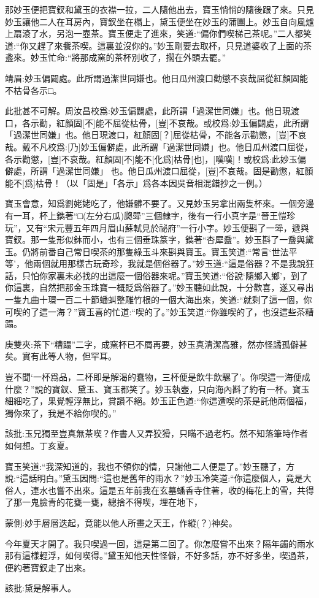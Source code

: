 \begin{parag}
    那妙玉便把寶釵和黛玉的衣襟一拉，二人隨他出去，寶玉悄悄的隨後跟了來。只見妙玉讓他二人在耳房內，寶釵坐在榻上，黛玉便坐在妙玉的蒲團上。妙玉自向風爐上扇滾了水，另泡一壺茶。寶玉便走了進來，笑道:“偏你們喫梯己茶呢。”二人都笑道:“你又趕了來飺茶喫。這裏並沒你的。”妙玉剛要去取杯，只見道婆收了上面的茶盞來。妙玉忙命:“將那成窯的茶杯別收了，擱在外頭去罷。”\begin{note}靖眉:妙玉偏闢處。此所謂過潔世同嫌也。他日瓜州渡口勸懲不哀哉屈從紅顏固能不枯骨各示□。\end{note}\begin{subnote}此批甚不可解。周汝昌校爲:妙玉偏闢處，此所謂「過潔世同嫌」也。他日現渡口，各示勸，紅顏固[不]能不屈從枯骨，[豈]不哀哉。或校爲:妙玉偏闢處，此所謂「過潔世同嫌」也。他日現渡口，紅顏固[？]屈從枯骨，不能各示勸懲，[豈]不哀哉。戴不凡校爲:[乃]妙玉偏僻處，此所謂「過潔世同嫌」也。他日瓜州渡口屈從，各示勸懲，[豈]不哀哉。紅顏固[不]能不[化爲]枯骨[也]，[嘆嘆]！或校爲:此妙玉偏僻處，所謂「過潔世同嫌」 也。他日瓜州渡口屈從，[豈]不哀哉。固是勸懲，紅顏能不[爲]枯骨！（以「固是」「各示」爲各本因吳音相混錯抄之一例。）\end{subnote}寶玉會意，知爲劉姥姥吃了，他嫌髒不要了。又見妙玉另拿出兩隻杯來。一個旁邊有一耳，杯上鐫著“□(左分右瓜)瓟斝”三個隸字，後有一行小真字是“晉王愷珍玩”，又有“宋元豐五年四月眉山蘇軾見於祕府”一行小字。妙玉便斟了一斝，遞與寶釵。那一隻形似鉢而小，也有三個垂珠篆字，鐫著“杏犀䀉”。妙玉斟了一䀉與黛玉。仍將前番自己常日喫茶的那隻綠玉斗來斟與寶玉。寶玉笑道:“常言‘世法平等’，他兩個就用那樣古玩奇珍，我就是個俗器了。”妙玉道:“這是俗器？不是我說狂話，只怕你家裏未必找的出這麼一個俗器來呢。”寶玉笑道:“俗說‘隨鄉入鄉’，到了你這裏，自然把那金玉珠寶一概貶爲俗器了。”妙玉聽如此說，十分歡喜，遂又尋出一隻九曲十環一百二十節蟠虯整雕竹根的一個大海出來，笑道:“就剩了這一個，你可喫的了這一海？”寶玉喜的忙道:“喫的了。”妙玉笑道:“你雖喫的了，也沒這些茶糟蹋。\begin{note}庚雙夾:茶下“糟蹋”二字，成窯杯已不屑再要，妙玉真清潔高雅，然亦怪譎孤僻甚矣。實有此等人物，但罕耳。\end{note}豈不聞‘一杯爲品，二杯即是解渴的蠢物，三杯便是飲牛飲騾了’。你喫這一海便成什麼？”說的寶釵、黛玉、寶玉都笑了。妙玉執壺，只向海內斟了約有一杯。寶玉細細吃了，果覺輕浮無比，賞讚不絕。妙玉正色道:“你這遭喫的茶是託他兩個福，獨你來了，我是不給你喫的。”\begin{note}該批:玉兄獨至豈真無茶喫？作書人又弄狡猾，只瞞不過老朽。然不知落筆時作者如何想。丁亥夏。\end{note}寶玉笑道:“我深知道的，我也不領你的情，只謝他二人便是了。”妙玉聽了，方說:“這話明白。”黛玉因問:“這也是舊年的雨水？”妙玉冷笑道:“你這麼個人，竟是大俗人，連水也嘗不出來。這是五年前我在玄墓蟠香寺住著，收的梅花上的雪，共得了那一鬼臉青的花甕一甕，總捨不得喫，埋在地下，\begin{note}蒙側:妙手層層迭起，竟能以他人所畫之天王，作縱(？)神矣。\end{note}今年夏天才開了。我只喫過一回，這是第二回了。你怎麼嘗不出來？隔年蠲的雨水那有這樣輕浮，如何喫得。”黛玉知他天性怪僻，不好多話，亦不好多坐，喫過茶，便約著寶釵走了出來。\begin{note}該批:黛是解事人。\end{note}
\end{parag}


